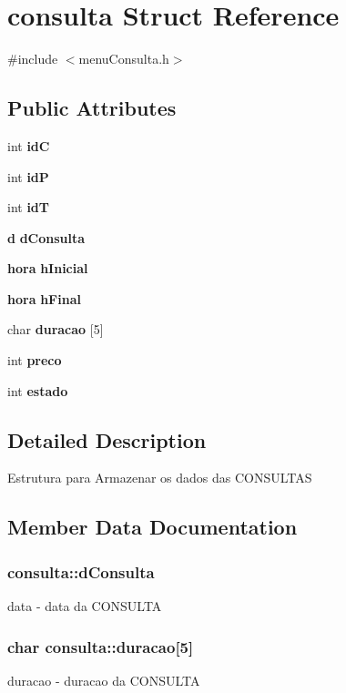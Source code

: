 \section{consulta Struct Reference}
\label{structconsulta}


{\ttfamily \#include $<$menu\+Consulta.\+h$>$}

\subsection*{Public Attributes}
\begin{DoxyCompactItemize}
\item 
int {\bf id\+C}
\item 
int {\bf id\+P}
\item 
int {\bf id\+T}
\item 
{\bf d} {\bf d\+Consulta}
\item 
{\bf hora} {\bf h\+Inicial}
\item 
{\bf hora} {\bf h\+Final}
\item 
char {\bf duracao} [5]
\item 
int {\bf preco}
\item 
int {\bf estado}
\end{DoxyCompactItemize}


\subsection{Detailed Description}
Estrutura para Armazenar os dados das C\+O\+N\+S\+U\+L\+T\+A\+S 

\subsection{Member Data Documentation}
\subsubsection[{d\+Consulta}]{ consulta\+::d\+Consulta}\label{structconsulta_a52a9310d3e46bd499a6b886f0cb5daa7}
data -\/ data da C\+O\+N\+S\+U\+L\+T\+A 
\subsubsection[{duracao}]{\setlength{\rightskip}{0pt plus 5cm}char consulta\+::duracao[5]}\label{structconsulta_af8b794db593e7826d1a3daa7947692db}
duracao -\/ duracao da C\+O\+N\+S\+U\+L\+T\+A 
